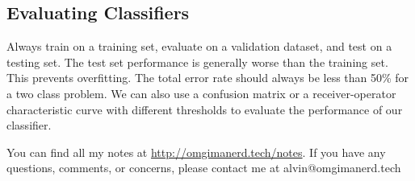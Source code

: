 \documentclass{math}
\begin{document}
\subsection*{Evaluating Classifiers}
Always train on a training set, evaluate on a validation dataset, and test on
a testing set. The test set performance is generally worse than the training
set. This prevents overfitting. The total error rate should always be less
than 50\% for a two class problem. We can also use a confusion matrix or a
receiver-operator characteristic curve with different thresholds to evaluate
the performance of our classifier.

\begin{center}
  You can find all my notes at \url{http://omgimanerd.tech/notes}. If you have
  any questions, comments, or concerns, please contact me at
  alvin@omgimanerd.tech
\end{center}
\end{document}
